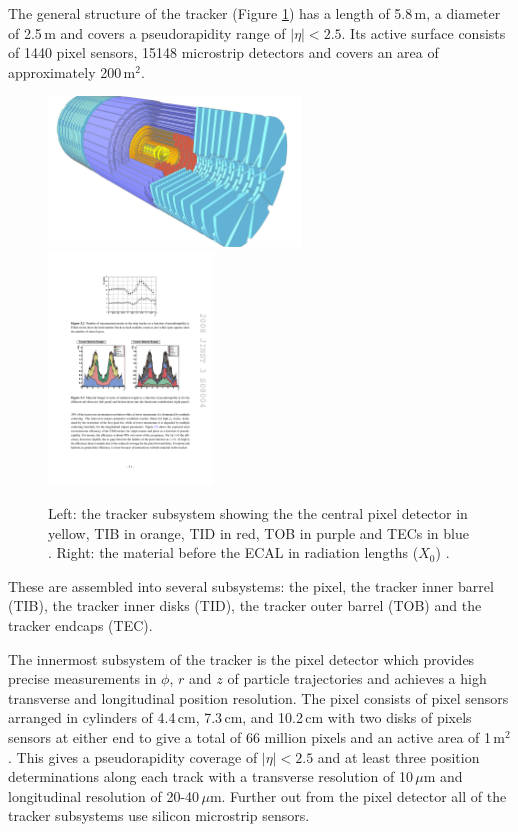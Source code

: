 The general structure of the tracker (Figure \ref{fig:apparatus:tracker}) has a length of 5.8\,m, a diameter of 2.5\,m and covers a pseudorapidity range of $|\eta|<2.5$. Its active surface consists of 1440 pixel sensors, 15148 microstrip detectors and covers an area of approximately 200\,m$^{2}$. 
\begin{figure}[h!]
    \begin{center}
        \includegraphics[width=0.6\textwidth]{figures/apparatus/tracker_colour.pdf}
        \includegraphics[width=0.39\textwidth]{figures/apparatus/tracker_material.pdf}
    \end{center}
    \caption{Left: the tracker subsystem showing the the central pixel detector in yellow, TIB in orange, TID in red, TOB in purple and TECs in blue \cite{SketchupCMS}. Right: the material before the ECAL in radiation lengths ($X_{0}$) \cite{CMSatLHC}.}
    \label{fig:apparatus:tracker}
\end{figure}
These are assembled into several subsystems: the pixel, the tracker inner barrel (TIB), the tracker inner disks (TID), the tracker outer barrel (TOB) and the tracker endcaps (TEC).

The innermost subsystem of the tracker is the pixel detector which provides precise measurements in $\phi$, $r$ and $z$ of particle trajectories and achieves a high transverse and longitudinal position resolution. The pixel consists of pixel sensors arranged in cylinders of 4.4\,cm, 7.3\,cm, and 10.2\,cm with two disks of pixels sensors at either end to give a total of 66 million pixels and an active area of 1\,m$^{2}$. This gives a pseudorapidity coverage of $|\eta|<2.5$ and at least three position determinations along each track with a transverse resolution of 10\,$\mu$m and longitudinal resolution of 20-40\,$\mu$m. Further out from the pixel detector all of the tracker subsystems use silicon microstrip sensors. 



